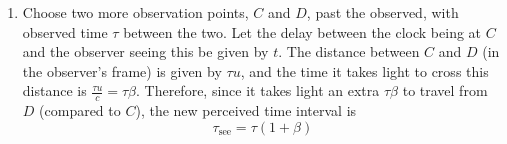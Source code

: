 \documentclass[fleqn]{article}[12pt]
\begin{document}
\begin{enumerate}
\begin{enumerate}
        \item Choose two more observation points, $C$ and $D$, past the observed, with observed time $\tau$ between the two. Let the delay between the clock being at $C$ and the observer seeing this be given by $t$. The distance between $C$ and $D$ (in the observer's frame) is given by $\tau u$, and the time it takes light to cross this distance is $\frac{\tau u}{c} = \tau \beta$. Therefore, since it takes light an extra $\tau \beta$ to travel from $D$ (compared to $C$), the new perceived time interval is
        \begin{equation*}
            \tau_{\text{see}} = \tau(1+\beta)
        \end{equation*}
    \end{enumerate}



\end{enumerate}
\end{document}
